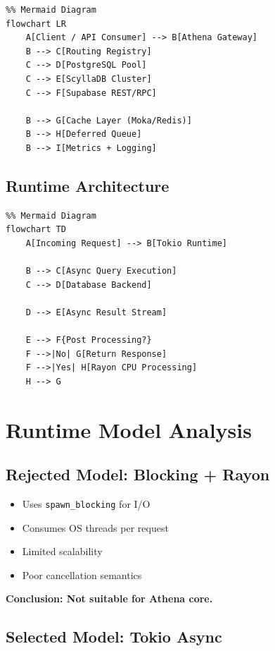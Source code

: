 \documentclass[11pt,a4paper]{article}
\begin{document}
\begin{verbatim}
%% Mermaid Diagram
flowchart LR
    A[Client / API Consumer] --> B[Athena Gateway]
    B --> C[Routing Registry]
    C --> D[PostgreSQL Pool]
    C --> E[ScyllaDB Cluster]
    C --> F[Supabase REST/RPC]

    B --> G[Cache Layer (Moka/Redis)]
    B --> H[Deferred Queue]
    B --> I[Metrics + Logging]
\end{verbatim}

\subsection{Runtime Architecture}

\begin{verbatim}
%% Mermaid Diagram
flowchart TD
    A[Incoming Request] --> B[Tokio Runtime]

    B --> C[Async Query Execution]
    C --> D[Database Backend]

    D --> E[Async Result Stream]

    E --> F{Post Processing?}
    F -->|No| G[Return Response]
    F -->|Yes| H[Rayon CPU Processing]
    H --> G
\end{verbatim}

\newpage

\section{Runtime Model Analysis}

\subsection{Rejected Model: Blocking + Rayon}

\begin{itemize}
\item Uses \texttt{spawn\_blocking} for I/O
\item Consumes OS threads per request
\item Limited scalability
\item Poor cancellation semantics
\end{itemize}

\textbf{Conclusion: Not suitable for Athena core.}

\subsection{Selected Model: Tokio Async}
\end{document}
